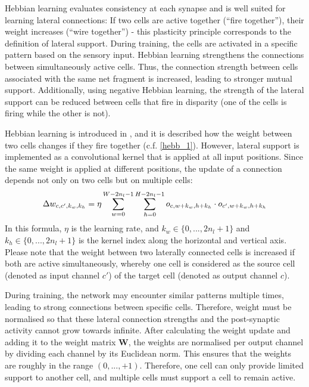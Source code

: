 Hebbian learning evaluates consistency at each synapse and is well suited for learning lateral connections: If two cells are active together (``fire together''), their weight increases (``wire together'') - this plasticity principle corresponds to the definition of lateral support. During training, the cells are activated in a specific pattern based on the sensory input. Hebbian learning strengthens the connections between simultaneously active cells. Thus, the connection strength between cells associated with the same net fragment is increased, leading to stronger mutual support. Additionally, using negative Hebbian learning, the strength of the lateral support can be reduced between cells that fire in disparity (one of the cells is firing while the other is not).

Hebbian learning is introduced in , and it is described how the weight between two cells changes if they fire together (c.f. \eqref{hebb_1}).
However, lateral support is implemented as a convolutional kernel that is applied at all input positions.
Since the same weight is applied at different positions, the update of a connection depends not only on two cells but on multiple cells:
%
\begin{align}\eqlbl{hebbu_1}
	\Delta w_{c, c',k_w,k_h} = \eta \sum_{w = 0}^{W - 2n_l - 1} \sum_{h = 0}^{H - 2n_l - 1} o_{c,w+k_w,h+k_h} \cdot o_{c',w+k_w,h+k_h}
\end{align}
%
In this formula, $\eta$ is the learning rate, and $k_w \in \{0, ..., 2n_l+1\}$ and $k_h\in \{0, ..., 2n_l+1 \}$ is the kernel index along the horizontal and vertical axis.
Please note that the weight between two laterally connected cells is increased if both are active simultaneously, whereby one cell is considered as the source cell (denoted as input channel $c'$) of the target cell (denoted as output channel $c$).

During training, the network may encounter similar patterns multiple times, leading to strong connections between specific cells. Therefore, weight must be normalised so that these lateral connection strengths and the post-synaptic activity cannot grow towards infinite. After calculating the weight update and adding it to the weight matrix $\boldsymbol{W}$, the weights are normalised per output channel by dividing each channel by its Euclidean norm. This ensures that the weights are roughly in the range $(0, ..., +1)$.
Therefore, one cell can only provide limited support to another cell, and multiple cells must support a cell to remain active.


